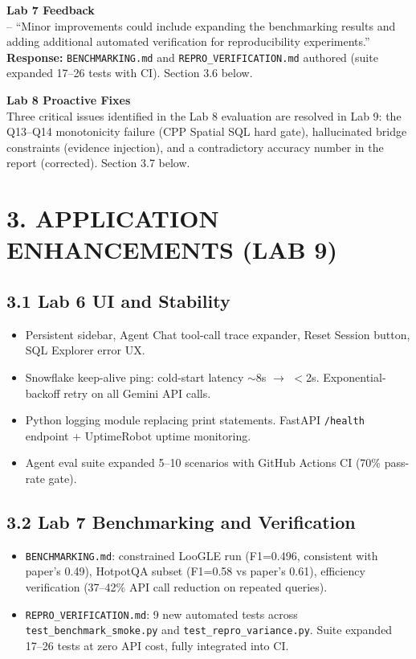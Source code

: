 \documentclass[11pt, letterpaper]{article}
\begin{document}
\textbf{Lab 7 Feedback} \\
-- ``Minor improvements could include expanding the benchmarking results and adding additional automated verification for reproducibility experiments.'' \\
\textbf{Response:} \texttt{BENCHMARKING.md} and \texttt{REPRO\_VERIFICATION.md} authored (suite expanded 17--26 tests with CI). Section 3.6 below.

\textbf{Lab 8 Proactive Fixes} \\
Three critical issues identified in the Lab 8 evaluation are resolved in Lab 9: the Q13--Q14 monotonicity failure (CPP Spatial SQL hard gate), hallucinated bridge constraints (evidence injection), and a contradictory accuracy number in the report (corrected). Section 3.7 below.

\section{3. APPLICATION ENHANCEMENTS (LAB 9)}

\subsection*{3.1 Lab 6 UI and Stability}
\begin{itemize}[leftmargin=*]
    \item Persistent sidebar, Agent Chat tool-call trace expander, Reset Session button, SQL Explorer error UX.
    \item Snowflake keep-alive ping: cold-start latency $\sim$8s $\rightarrow$ $<$2s. Exponential-backoff retry on all Gemini API calls.
    \item Python logging module replacing print statements. FastAPI \texttt{/health} endpoint + UptimeRobot uptime monitoring.
    \item Agent eval suite expanded 5--10 scenarios with GitHub Actions CI (70\% pass-rate gate).
\end{itemize}

\subsection*{3.2 Lab 7 Benchmarking and Verification}
\begin{itemize}[leftmargin=*]
    \item \texttt{BENCHMARKING.md}: constrained LooGLE run (F1=0.496, consistent with paper's 0.49), HotpotQA subset (F1=0.58 vs paper's 0.61), efficiency verification (37--42\% API call reduction on repeated queries).
    \item \texttt{REPRO\_VERIFICATION.md}: 9 new automated tests across \texttt{test\_benchmark\_smoke.py} and \texttt{test\_repro\_variance.py}. Suite expanded 17--26 tests at zero API cost, fully integrated into CI.
\end{itemize}
\end{document}
